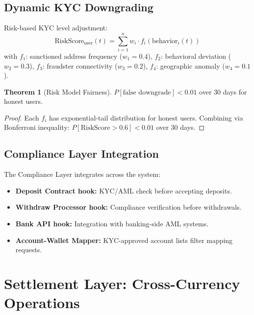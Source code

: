 \documentclass[12pt,a4paper]{article}
\theoremstyle{definition}
\newtheorem{theorem}{Theorem}[section]
\theoremstyle{remark}
\begin{document}
\subsection{Dynamic KYC Downgrading}

Risk-based KYC level adjustment:
\begin{equation}
\text{RiskScore}_{\text{user}}(t) = \sum_{i=1}^{n} w_i \cdot f_i(\text{behavior}_i(t))
\end{equation}
with $f_1$: sanctioned address frequency ($w_1 = 0.4$), $f_2$: behavioral deviation ($w_2 = 0.3$), $f_3$: fraudster connectivity ($w_3 = 0.2$), $f_4$: geographic anomaly ($w_4 = 0.1$).

\begin{theorem}[Risk Model Fairness]
\label{thm:risk-fairness}
$P[\text{false downgrade}] < 0.01$ over 30 days for honest users.
\end{theorem}

\begin{proof}
Each $f_i$ has exponential-tail distribution for honest users. Combining via Bonferroni inequality: $P[\text{RiskScore} > 0.6] < 0.01$ over 30 days.
\end{proof}

\subsection{Compliance Layer Integration}

The Compliance Layer integrates across the system:
\begin{itemize}[nosep]
    \item \textbf{Deposit Contract hook:} KYC/AML check before accepting deposits.
    \item \textbf{Withdraw Processor hook:} Compliance verification before withdrawals.
    \item \textbf{Bank API hook:} Integration with banking-side AML systems.
    \item \textbf{Account-Wallet Mapper:} KYC-approved account lists filter mapping requests.
\end{itemize}


\section{Settlement Layer: Cross-Currency Operations}
\label{sec:settlement-formal}
\end{document}

